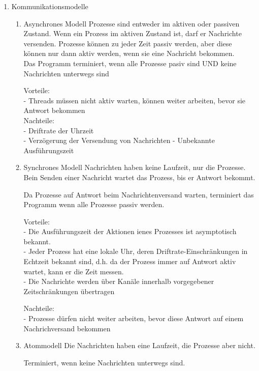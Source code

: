 \begin{enumerate}

\item Kommunikationsmodelle \\

\begin{enumerate}

\item Asynchrones Modell
Prozesse sind entweder im aktiven oder passiven Zustand. Wenn ein Prozess im aktiven Zustand ist, darf er Nachrichte versenden. Prozesse können zu jeder Zeit passiv werden, aber diese können nur dann aktiv werden, wenn sie eine Nachricht bekommen.\\

Das Programm terminiert, wenn alle Prozesse pasiv sind UND keine Nachrichten unterwegs sind

Vorteile: \\
- Threads müssen nicht aktiv warten, können weiter arbeiten, bevor sie Antwort bekommen\\

Nachteile: \\
- Driftrate der Uhrzeit \\
- Verzögerung der Versendung von Nachrichten
- Unbekannte Ausführungszeit

\item Synchrones Modell
Nachrichten haben keine Laufzeit, nur die Prozesse. Bein Senden einer Nachricht wartet das Prozess, bis er Antwort bekommt.

Da Prozesse auf Antwort beim Nachrichtenversand warten, terminiert das Programm wenn alle Prozesse passiv werden.

Vorteile: \\
- Die Ausführungszeit der Aktionen ienes Prozesses ist asymptotisch bekannt. \\
- Jeder Prozess hat eine lokale Uhr, deren Driftrate-Einschränkungen in Echtzeit bekannt sind, d.h. da der Prozess immer auf Antwort aktiv wartet, kann er die Zeit messen. \\
- Die Nachrichte werden über Kanäle innerhalb vorgegebener Zeitschränkungen übertragen

Nachteile: \\
- Prozesse dürfen nicht weiter arbeiten, bevor diese Antwort auf einem Nachrichversand bekommen

\item Atommodell 
Die Nachrichten haben eine Laufzeit, die Prozesse aber nicht.

Terminiert, wenn keine Nachrichten unterwegs sind.


\end{enumerate}
\end{enumerate}
